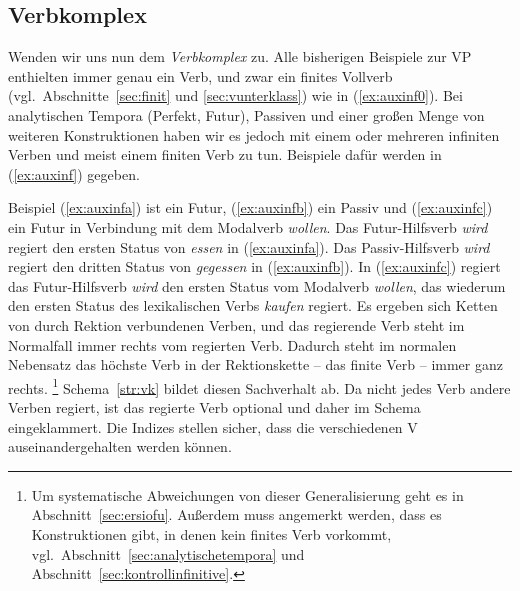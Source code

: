 
\subsection{Verbkomplex}

\label{sec:verbkomplexe}


Wenden wir uns nun dem \textit{Verbkomplex} zu.
Alle bisherigen Beispiele zur VP enthielten immer genau ein Verb, und zwar ein finites Vollverb (vgl.\ Abschnitte~\ref{sec:finit} und \ref{sec:vunterklass}) wie in (\ref{ex:auxinf0}).
Bei analytischen Tempora (Perfekt, Futur), Passiven und einer großen Menge von weiteren Konstruktionen haben wir es jedoch mit einem oder mehreren infiniten Verben und meist einem finiten Verb zu tun.
Beispiele dafür werden in (\ref{ex:auxinf}) gegeben.

\begin{exe}
  \ex\label{ex:auxinf}
  \begin{xlist}
  \end{xlist}
\end{exe}

Beispiel (\ref{ex:auxinfa}) ist ein Futur, (\ref{ex:auxinfb}) ein Passiv und (\ref{ex:auxinfc}) ein Futur in Verbindung mit dem Modalverb \textit{wollen}.
Das Futur-Hilfsverb \textit{wird} regiert den ersten Status von \textit{essen} in (\ref{ex:auxinfa}).
Das Passiv-Hilfsverb \textit{wird} regiert den dritten Status von \textit{gegessen} in (\ref{ex:auxinfb}).
In (\ref{ex:auxinfc}) regiert das Futur-Hilfsverb \textit{wird} den ersten Status vom Modalverb \textit{wollen}, das wiederum den ersten Status des lexikalischen Verbs \textit{kaufen} regiert.
Es ergeben sich Ketten von durch Rektion verbundenen Verben, und das regierende Verb steht im Normalfall immer rechts vom regierten Verb.
Dadurch steht im normalen Nebensatz das höchste Verb in der Rektionskette -- das finite Verb -- immer ganz rechts.%
\footnote{Um systematische Abweichungen von dieser Generalisierung geht es in Abschnitt~\ref{sec:ersiofu}.
Außerdem muss angemerkt werden, dass es Konstruktionen gibt, in denen kein finites Verb vorkommt, vgl.\ Abschnitt~\ref{sec:analytischetempora} und Abschnitt~\ref{sec:kontrollinfinitive}.}
Schema~\ref{str:vk} bildet diesen Sachverhalt ab.
Da nicht jedes Verb andere Verben regiert, ist das regierte Verb optional und daher im Schema eingeklammert.
Die Indizes stellen sicher, dass die verschiedenen V auseinandergehalten werden können.

